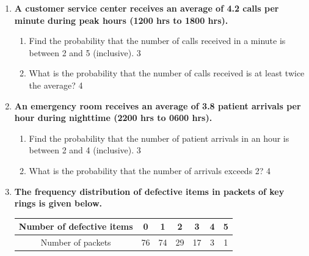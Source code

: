 \documentclass[a4paper,oneside, margin=1.4in]{book}
\begin{document}
\begin{enumerate}
  \begin{enumerate}
    \item
	Give an example where Poisson distribution is applicable. \hfill 1
    \item
	Find the relationship between expectation and standard deviation of Poisson distribution. \hfill 2
    \item  
	Find the probability that the number of calls is between 1 and 3 (inclusive). \hfill 3
    \item
	What is the probability that the number of calls received is greater than the average? \hfill 4
  \end{enumerate}
  
  \item  
  \textbf{A customer service center receives an average of 4.2 calls per minute during peak hours (1200 hrs to 1800 hrs).}  

  \begin{enumerate}  
    \item  
      Find the probability that the number of calls received in a minute is between 2 and 5 (inclusive). \hfill 3  
    \item  
      What is the probability that the number of calls received is at least twice the average? \hfill 4  
  \end{enumerate}  

\item  
  \textbf{An emergency room receives an average of 3.8 patient arrivals per hour during nighttime (2200 hrs to 0600 hrs).}  

  \begin{enumerate}  
    \item  
      Find the probability that the number of patient arrivals in an hour is between 2 and 4 (inclusive). \hfill 3  
    \item  
      What is the probability that the number of arrivals exceeds 2? \hfill 4  
  \end{enumerate}  

  
     \item
	  \textbf{The frequency distribution of defective items in packets of key rings is given below.} 
	  
	  \begin{table}[h]
	  \centering
\begin{tabular}{c|c|c|c|c|c|c}
Number of defective items & 0 & 1 & 2 & 3 & 4 & 5 \\ \hline
Number of packets & 76 & 74 & 29 & 17 & 3 & 1
\end{tabular}
\end{table}
  

\end{enumerate}
\end{document}
